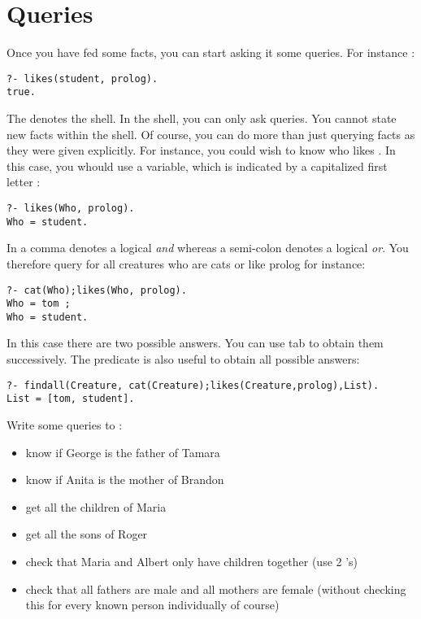 \documentclass{../../../tp}
\begin{document}
\section{Queries}
 
Once you have fed \prolog some facts, you can start asking it some queries. For instance :

\begin{verbatim}
?- likes(student, prolog).
true.
\end{verbatim}

The  denotes the \prolog shell. In the shell, you can only ask queries. You cannot state new facts within the shell. Of course, you can do more than just querying facts as they were given explicitly. For instance, you could wish to know who likes \prolog. In this case, you whould use a variable, which is indicated by a capitalized first letter :

\begin{verbatim}
?- likes(Who, prolog).
Who = student.
\end{verbatim}

In \prolog a comma \prologcode{,} denotes a logical \emph{and} whereas a semi-colon denotes a logical \emph{or}. You therefore query for all creatures who are cats or like prolog for instance:

\begin{verbatim}
?- cat(Who);likes(Who, prolog).
Who = tom ;
Who = student.
\end{verbatim}

In this case there are two possible answers. You can use tab to obtain them successively. The  predicate is also useful to obtain all possible answers:

\begin{verbatim}
?- findall(Creature, cat(Creature);likes(Creature,prolog),List).
List = [tom, student].
\end{verbatim}


\begin{instruction}
	Write some queries to :
	\begin{itemize}
		\item know if George is the father of Tamara
		\item know if Anita is the mother of Brandon
		\item get all the children of Maria
		\item get all the sons of Roger
		\item check that Maria and Albert only have children together (use 2 's)
		\item check that all fathers are male and all mothers are female (without checking this for every known person individually of course)
	\end{itemize}
\end{instruction}
\end{document}
